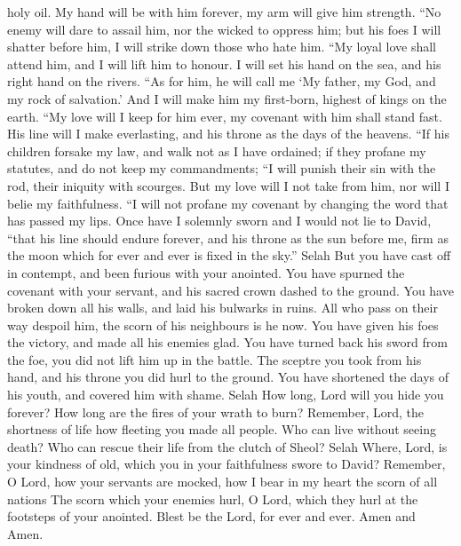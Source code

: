 holy oil.  My hand will be with him forever, my arm will
give him strength.  ``No enemy will dare to assail him, nor
the wicked to oppress him;  but his foes I will shatter
before him, I will strike down those who hate him.  ``My
loyal love shall attend him, and I will lift him to honour.
 I will set his hand on the sea, and his right hand on the
rivers.  ``As for him, he will call me `My father, my God,
and my rock of salvation.'  And I will make him my
first-born, highest of kings on the earth.  ``My love will
I keep for him ever, my covenant with him shall stand fast.
 His line will I make everlasting, and his throne as the
days of the heavens.  ``If his children forsake my law, and
walk not as I have ordained;  if they profane my statutes,
and do not keep my commandments;  ``I will punish their sin
with the rod, their iniquity with scourges.  But my love
will I not take from him, nor will I belie my faithfulness.
 ``I will not profane my covenant by changing the word that
has passed my lips.  Once have I solemnly sworn and I would
not lie to David,  ``that his line should endure forever,
and his throne as the sun before me,  firm as the moon
which for ever and ever is fixed in the sky.'' Selah  But
you have cast off in contempt, and been furious with your anointed.
 You have spurned the covenant with your servant, and his
sacred crown dashed to the ground.  You have broken down
all his walls, and laid his bulwarks in ruins.  All who
pass on their way despoil him, the scorn of his neighbours is he now.
 You have given his foes the victory, and made all his
enemies glad.  You have turned back his sword from the foe,
you did not lift him up in the battle.  The sceptre you
took from his hand, and his throne you did hurl to the ground.
 You have shortened the days of his youth, and covered him
with shame. Selah  How long, Lord will you hide you
forever? How long are the fires of your wrath to burn? 
Remember, Lord, the shortness of life how fleeting you made all people.
 Who can live without seeing death? Who can rescue their
life from the clutch of Sheol? Selah  Where, Lord, is your
kindness of old, which you in your faithfulness swore to David?
 Remember, O Lord, how your servants are mocked, how I bear
in my heart the scorn of all nations  The scorn which your
enemies hurl, O Lord, which they hurl at the footsteps of your anointed.
 Blest be the Lord, for ever and ever. Amen and Amen.

